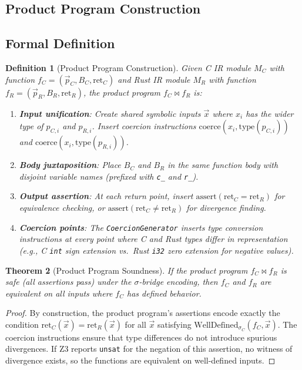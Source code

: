 \documentclass[11pt,a4paper]{article}
\newtheorem{theorem}{Theorem}
\newtheorem{definition}[theorem]{Definition}
\begin{document}
\begin{appendices}
\section{Product Program Construction}\label{app:product-program}

\subsection{Formal Definition}

\begin{definition}[Product Program Construction]
Given C IR module $M_C$ with function $f_C = (\vec{p}_C, B_C, \text{ret}_C)$
and Rust IR module $M_R$ with function $f_R = (\vec{p}_R, B_R, \text{ret}_R)$,
the product program $f_C \bowtie f_R$ is:
\begin{enumerate}
  \item \textbf{Input unification}: Create shared symbolic inputs
    $\vec{x}$ where $x_i$ has the wider type of $p_{C,i}$ and $p_{R,i}$.
    Insert coercion instructions $\text{coerce}(x_i, \text{type}(p_{C,i}))$
    and $\text{coerce}(x_i, \text{type}(p_{R,i}))$.
  \item \textbf{Body juxtaposition}: Place $B_C$ and $B_R$ in the same
    function body with disjoint variable names (prefixed with
    \texttt{c\_} and \texttt{r\_}).
  \item \textbf{Output assertion}: At each return point, insert
    $\text{assert}(\text{ret}_C = \text{ret}_R)$ for equivalence
    checking, or $\text{assert}(\text{ret}_C \neq \text{ret}_R)$ for
    divergence finding.
  \item \textbf{Coercion points}: The \texttt{CoercionGenerator}
    inserts type conversion instructions at every point where C and
    Rust types differ in representation (e.g., C \texttt{int} sign
    extension vs.\ Rust \texttt{i32} zero extension for negative
    values).
\end{enumerate}
\end{definition}

\begin{theorem}[Product Program Soundness]\label{thm:product-sound}
If the product program $f_C \bowtie f_R$ is safe (all assertions pass)
under the $\sigma$-bridge encoding, then $f_C$ and $f_R$ are equivalent
on all inputs where $f_C$ has defined behavior.
\end{theorem}

\begin{proof}
By construction, the product program's assertions encode exactly the
condition $\text{ret}_C(\vec{x}) = \text{ret}_R(\vec{x})$ for all
$\vec{x}$ satisfying $\text{WellDefined}_{\sigma_C}(f_C, \vec{x})$.
The coercion instructions ensure that type differences do not introduce
spurious divergences.  If Z3 reports \texttt{unsat} for the negation
of this assertion, no witness of divergence exists, so the functions
are equivalent on well-defined inputs.
\end{proof}



\end{appendices}
\end{document}
